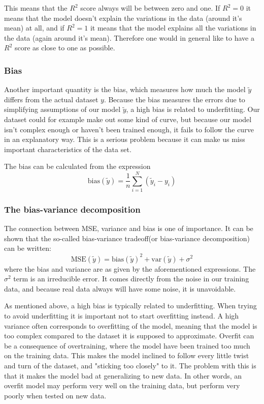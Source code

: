 \documentclass[a4paper,12pt]{article}
\begin{document}
This means that the $R^2$ score always will be between zero and one. If $R^2 = 0$ it means that the model doesn't explain the variations in the data (around it's mean) at all, and if $R^2 = 1$ it means that the model explains all the variations in the data (again around it's mean). Therefore one would in general like to have a $R^2$ score as close to one as possible.\newline

\subsubsection{Bias}
Another important quantity is the bias, which measures how much the model $\tilde{y}$ differs from the actual dataset $y$. Because the bias measures the errors due to simplifying assumptions of our model $\tilde{y}$, a high bias is related to underfitting. Our dataset could for example make out some kind of curve, but because our model isn't complex enough or haven't been trained enough, it fails to follow the curve in an explanatory way. This is a serious problem because it can make us miss important characteristics of the data set.

The bias can be calculated from the expression
\begin{equation}
\text{bias}(\tilde{y})=\frac{1}{n}\sum_{i=1}^N(\tilde{y}_i - y_i)
\end{equation}

\subsubsection{The bias-variance decomposition}
The connection between MSE, variance and bias is one of importance. It can be shown that the so-called bias-variance tradeoff(or bias-variance decomposition) can be written:
\begin{equation}
\text{MSE}(\tilde{y})=\text{bias}(\tilde{y})^2 + \text{var}(\tilde{y}) +\sigma^2
\end{equation}
where the bias and variance are as given by the aforementioned expressions. The $\sigma^2$ term is an irreducible error. It comes directly from the noise in our training data, and because real data always will have some noise, it is unavoidable.\newline

As mentioned above, a high bias is typically related to underfitting. When trying to avoid underfitting it is important not to start overfitting instead.
A high variance often corresponds to overfitting of the model, meaning that the model is too complex compared to the dataset it is supposed to approximate. Overfit can be a consequence of overtraining, where the model have been trained too much on the training data. This makes the model inclined to follow every little twist and turn of the dataset, and "sticking too closely" to it. The problem with this is that it makes the model bad at generalizing to new data. In other words, an overfit model may perform very well on the training data, but perform very poorly when tested on new data.
\end{document}
